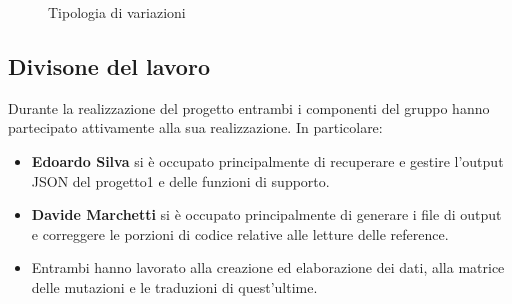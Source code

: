 \documentclass[11pt,italian]{article}
\begin{document}
\begin{figure}[H]
  \caption{Tipologia di variazioni}
  \label{fig:jalview-inner}
\end{figure}

\subsection{Divisone del lavoro}
Durante la realizzazione del progetto entrambi i componenti del gruppo hanno partecipato attivamente alla sua realizzazione. In particolare:
\begin{itemize}
  \item \textbf{Edoardo Silva} si è occupato principalmente di recuperare e gestire l'output JSON del progetto1 e delle funzioni di supporto.
  \item \textbf{Davide Marchetti} si è occupato principalmente di generare i file di output e correggere le porzioni di codice relative alle letture delle reference.
  \item Entrambi hanno lavorato alla creazione ed elaborazione dei dati, alla matrice delle mutazioni e le traduzioni di quest'ultime.
\end{itemize}
\end{document}
